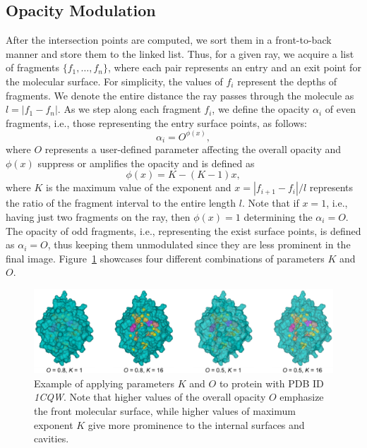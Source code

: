 \subsection{Opacity Modulation}\label{sec:opacity}
After the intersection points are computed, we sort them in a front-to-back manner and store them to the linked list. 
Thus, for a given ray, we acquire a list of fragments $\{f_1,\ldots,f_n \}$, where each pair represents an entry and an exit point for the molecular surface. For simplicity, the values of $f_i$ represent the depths of fragments. 
We denote the entire distance the ray passes through the molecule as $l=|f_1-f_n|$. 
As we step along each fragment $f_i$, we define the opacity $\alpha_i$ of even fragments, i.e., those representing the entry surface points, as follows:
\begin{equation}
  \alpha_i = O^{\phi(x)},
	\label{eq:alphaDistEven}
\end{equation}	
where $O$ represents a user-defined parameter affecting the overall opacity and $\phi(x)$ suppress or amplifies the opacity and is defined as
\begin{equation}
  \phi(x) = K-(K-1)x,
	\label{eq:exponent}
\end{equation}	
where $K$ is the maximum value of the exponent and $x=|f_{i+1}-f_i|/l$ represents the ratio of the fragment interval to the entire length $l$. Note that if $x=1$, i.e., having just two fragments on the ray, then $\phi(x)=1$ determining the $\alpha_i=O$. The opacity of odd fragments, i.e., representing the exist surface points, is defined as $\alpha_i = O$, thus keeping them unmodulated since they are less prominent in the final image.
Figure~\ref{fig:Oparam} showcases four different combinations of parameters $K$ and $O$.
\begin{figure}[htb]
  \centering
  \includegraphics[width=\textwidth]{image/Oparam2.pdf}
  \caption{Example of applying parameters $K$ and $O$ to protein with PDB ID \textit{1CQW}. Note that higher values of the overall opacity $O$ emphasize the front molecular surface, while higher values of maximum exponent $K$ give more prominence to the internal surfaces and cavities.}
	\label{fig:Oparam}
\end{figure}

